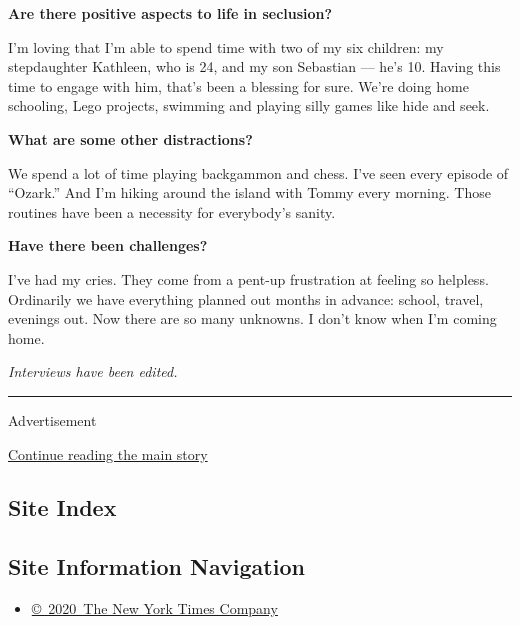 \textbf{Are there positive aspects to life in seclusion?}

I'm loving that I'm able to spend time with two of my six children: my
stepdaughter Kathleen, who is 24, and my son Sebastian --- he's 10.
Having this time to engage with him, that's been a blessing for sure.
We're doing home schooling, Lego projects, swimming and playing silly
games like hide and seek.

\textbf{What are some other distractions?}

We spend a lot of time playing backgammon and chess. I've seen every
episode of ``Ozark.'' And I'm hiking around the island with Tommy every
morning. Those routines have been a necessity for everybody's sanity.

\textbf{Have there been challenges?}

I've had my cries. They come from a pent-up frustration at feeling so
helpless. Ordinarily we have everything planned out months in advance:
school, travel, evenings out. Now there are so many unknowns. I don't
know when I'm coming home.

\emph{Interviews have been edited.}

\begin{center}\rule{0.5\linewidth}{\linethickness}\end{center}

Advertisement

\protect\hyperlink{after-bottom}{Continue reading the main story}

\hypertarget{site-index}{%
\subsection{Site Index}\label{site-index}}

\hypertarget{site-information-navigation}{%
\subsection{Site Information
Navigation}\label{site-information-navigation}}

\begin{itemize}
\tightlist
\item
  \href{https://help.nytimes.com/hc/en-us/articles/115014792127-Copyright-notice}{©~2020~The
  New York Times Company}
\end{itemize}

